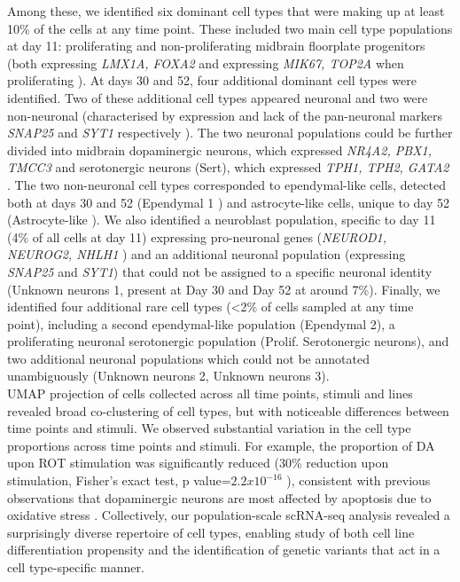 Among these, we identified six dominant cell types that were making up at least 10\% of the cells at any time point. 
These included two main cell type populations at day 11: proliferating and non-proliferating midbrain floorplate progenitors (both expressing \textit{LMX1A, FOXA2} and expressing \textit{MIK67, TOP2A} when proliferating \cite{la2016molecular}). 
At days 30 and 52, four additional dominant cell types were identified. Two of these additional cell types appeared neuronal and two were non-neuronal (characterised by expression and lack of the pan-neuronal markers \textit{SNAP25} and \textit{SYT1} respectively ). 
The two neuronal populations could be further divided into midbrain dopaminergic neurons, which expressed \textit{NR4A2, PBX1, TMCC3} \cite{la2016molecular, park2006acquisition, ramonet2012park9} and serotonergic neurons (Sert), which expressed \textit{TPH1, TPH2, GATA2} \cite{cummings2019serotonergic}. 
The two non-neuronal cell types corresponded to ependymal-like cells, detected both at days 30 and 52 (Ependymal 1 \cite{campbell2017molecular}) and astrocyte-like cells, unique to day 52 (Astrocyte-like \cite{sloan2017human, zhang2016purification}). 
We also identified a neuroblast population, specific to day 11 (4\% of all cells at day 11) expressing pro-neuronal genes (\textit{NEUROD1, NEUROG2, NHLH1} \cite{bertrand2002proneural, lacomme2012neurog2}) and an additional neuronal population (expressing \textit{SNAP25} and \textit{SYT1}) that could not be assigned to a specific neuronal identity (Unknown neurons 1, present at Day 30 and Day 52 at around 7\%). 
Finally, we identified four additional rare cell types (<2\% of cells sampled at any time point), including a second ependymal-like population (Ependymal 2), a proliferating neuronal serotonergic population (Prolif. Serotonergic neurons), and two additional neuronal populations which could not be annotated unambiguously (Unknown neurons 2, Unknown neurons 3).\\

UMAP projection of cells collected across all time points, stimuli and lines revealed broad co-clustering of cell types, but with noticeable differences between time points and stimuli. 
We observed substantial variation in the cell type proportions across time points
and stimuli. 
For example, the proportion of DA upon ROT stimulation was significantly reduced (30\% reduction upon stimulation, Fisher’s exact test, p value=$2.2x10^{-16}$ ), consistent with previous observations that dopaminergic neurons are most affected by apoptosis due to oxidative stress \cite{sherer2003mechanism, knonagel1992autologous, cannon2009highly}.
Collectively, our population-scale scRNA-seq analysis revealed a surprisingly diverse repertoire of cell types, enabling study of both cell line differentiation propensity and the identification of genetic variants that act in a cell type-specific manner.

